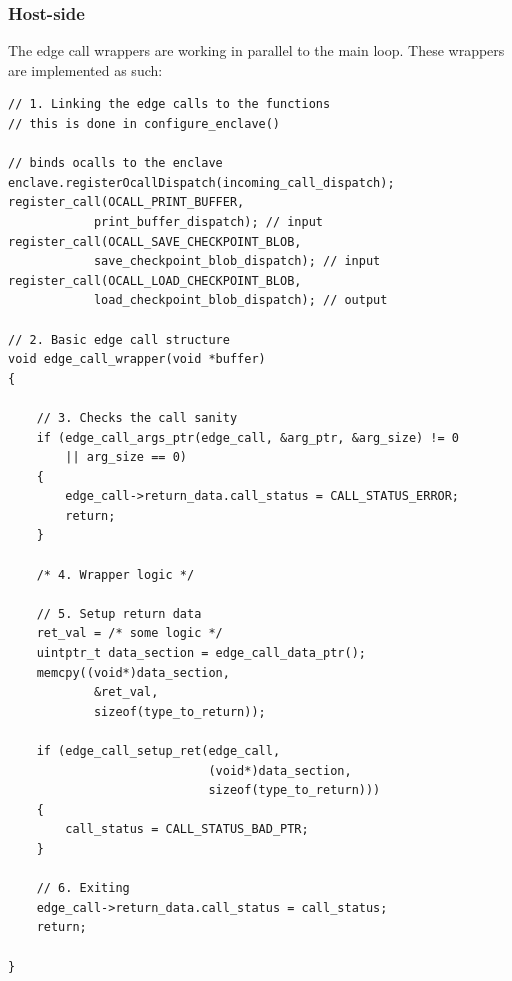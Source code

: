 \documentclass[11pt,a4paper]{report}
\begin{document}
\subsubsection{Host-side}
\label{subsub:edge-call-host}
The edge call wrappers are working in parallel to the main loop.
These wrappers are implemented as such:
\begin{verbatim}
// 1. Linking the edge calls to the functions
// this is done in configure_enclave()

// binds ocalls to the enclave 
enclave.registerOcallDispatch(incoming_call_dispatch); 
register_call(OCALL_PRINT_BUFFER, 
            print_buffer_dispatch); // input
register_call(OCALL_SAVE_CHECKPOINT_BLOB, 
            save_checkpoint_blob_dispatch); // input
register_call(OCALL_LOAD_CHECKPOINT_BLOB, 
            load_checkpoint_blob_dispatch); // output

// 2. Basic edge call structure
void edge_call_wrapper(void *buffer) 
{

    // 3. Checks the call sanity  
    if (edge_call_args_ptr(edge_call, &arg_ptr, &arg_size) != 0 
        || arg_size == 0) 
    {
        edge_call->return_data.call_status = CALL_STATUS_ERROR;
        return;
    }

    /* 4. Wrapper logic */ 

    // 5. Setup return data
    ret_val = /* some logic */
    uintptr_t data_section = edge_call_data_ptr();
    memcpy((void*)data_section, 
            &ret_val, 
            sizeof(type_to_return));
            
    if (edge_call_setup_ret(edge_call, 
                            (void*)data_section, 
                            sizeof(type_to_return))) 
    {
        call_status = CALL_STATUS_BAD_PTR;
    }

    // 6. Exiting
    edge_call->return_data.call_status = call_status;
    return;

}
\end{verbatim}
\end{document}
